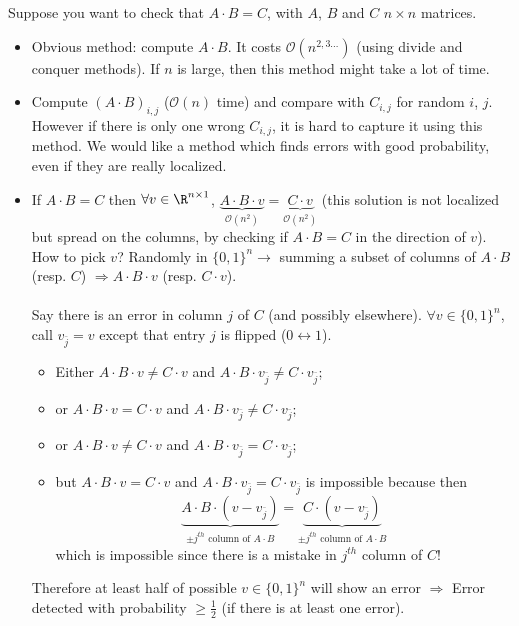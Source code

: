 Suppose you want to check that $A\cdot B=C$, with $A$, $B$ and $C$ $n\times n$ matrices.
\begin{itemize}
	\item Obvious method: compute $A\cdot B$. It costs $\mathcal{O}(n^{2,3\hdots})$ (using divide and conquer methods). If $n$ is large, then this method might take a lot of time.
	\item Compute $\left( A\cdot B\right)_{i,j}$ ($\mathcal{O}(n)$ time) and compare with $C_{i,j}$ for random $i$, $j$. However if there is only one wrong $C_{i,j}$, it is hard to capture it using this method. We would like a method which finds errors with good probability, even if they are really localized.
	\item If $A\cdot B=C$ then $\forall v\in \R^{n\times 1}$, $\underbrace{A\cdot B\cdot v}_{\mathcal{O}(n^2)}=\underbrace{C\cdot v}_{\mathcal{O}(n^2)}$ (this solution is not localized but spread on the columns, by checking if $A\cdot B=C$ in the direction of $v$). How to pick $v$? Randomly in $\{0,1\}^n\rightarrow$ summing a subset of columns of $A\cdot B$ (resp. $C$) $\Rightarrow A\cdot B \cdot v$ (resp. $C\cdot v$).
	
	\paragraph{}
	
	Say there is an error in column $j$ of $C$ (and possibly elsewhere). $\forall v\in \{0,1\}^n$, call $v_{\bar{j}}=v$ except that entry $j$ is flipped ($0 \leftrightarrow 1$). 
	\begin{itemize}
		\item Either $A\cdot B\cdot v\neq C\cdot v$ and $A\cdot B\cdot v_{\bar{j}}\neq C\cdot v_{\bar{j}}$;
		\item or $A\cdot B\cdot v= C\cdot v$ and $A\cdot B\cdot v_{\bar{j}}\neq C\cdot v_{\bar{j}}$;
		\item or $A\cdot B\cdot v\neq C\cdot v$ and $A\cdot B\cdot v_{\bar{j}}= C\cdot v_{\bar{j}}$;
		\item but $A\cdot B\cdot v= C\cdot v$ and $A\cdot B\cdot v_{\bar{j}}= C\cdot v_{\bar{j}}$ is impossible because then 
		$$\underbrace{A\cdot B \cdot (v-v_{\bar{j}})}_{\pm j^{th} \text{ column of } A\cdot B}=\underbrace{C\cdot (v-v_{\bar{j}})}_{\pm j^{th} \text{ column of } A\cdot B}$$
		which is impossible since there is a mistake in $j^{th}$ column of $C$!
	\end{itemize}
	Therefore at least half of possible $v\in \{0,1\}^n$ will show an error $\Rightarrow$ Error detected with probability $\geq \frac{1}{2}$ (if there is at least one error).
	

\end{itemize}
